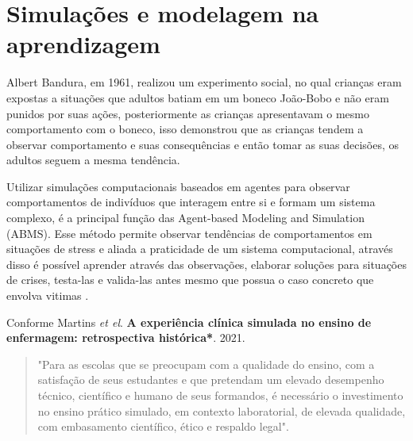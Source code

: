 \section{Simulações e modelagem na aprendizagem}

Albert Bandura, em 1961, realizou um experimento social, no qual crianças eram expostas a situações que adultos batiam em um boneco João-Bobo e não eram punidos por suas ações, posteriormente as crianças apresentavam o mesmo comportamento com o boneco, isso demonstrou que as crianças tendem a observar comportamento e suas consequências e então tomar as suas decisões, os adultos seguem a mesma tendência\cite{AlbertBandura}.

Utilizar simulações computacionais baseados em agentes para observar comportamentos de indivíduos que interagem entre si e formam um sistema complexo, é a principal função das Agent-based Modeling and Simulation (ABMS). Esse método permite observar tendências de comportamentos em situações de stress e aliada a praticidade de um sistema computacional, através disso é possível aprender através das observações, elaborar soluções para situações de crises, testa-las e valida-las antes mesmo que possua o caso concreto que envolva vitimas\cite{inproceedings} . 


Conforme Martins\textit{ et el}. \textbf{A experiência clínica simulada no ensino de enfermagem: retrospectiva histórica*}. 2021. 
 \begin{quotation}
"Para as escolas que se preocupam com a qualidade do ensino, com a satisfação de seus estudantes e que pretendam um elevado desempenho técnico, científico e humano de seus formandos, é necessário o investimento no ensino prático simulado, em contexto laboratorial, de elevada qualidade, com embasamento científico, ético e respaldo legal". \cite{ModelagemEnfermagem} 
 \end{quotation}




